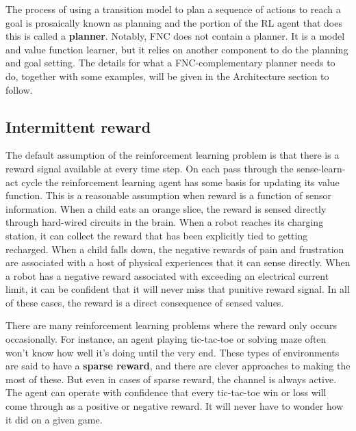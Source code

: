 The process of using a transition model to plan a sequence of actions
to reach a goal is prosaically known as planning and the portion of
the RL agent that does this is called a \textbf{planner}.
Notably, FNC does not contain a planner. It is a model
and value function learner, but it relies on another component to do
the planning and goal setting. The details for what a FNC-complementary
planner needs to do, together with some examples, will be given in
the Architecture section to follow. 

\subsection{Intermittent reward}
\label{subsec:introintermittent}

The default assumption of the reinforcement learning problem is that there is
a reward signal available at every time step. On each pass through the sense-learn-act
cycle the reinforcement learning agent has some basis for updating its
value function. This is a reasonable assumption when reward is a function of
sensor information. When a child eats an orange slice, the reward is sensed directly
through hard-wired circuits in the brain.
When a robot reaches its charging station, it can collect the reward that has
been explicitly tied to getting recharged. When a child falls down, the negative
rewards of pain and frustration are associated with a host of physical experiences
that it can sense directly. When a robot has a negative reward associated with
exceeding an electrical current limit, it can be confident that it will never
miss that punitive reward signal. In all of these cases, the reward
is a direct consequence of sensed values.

There are many reinforcement learning problems where the reward only occurs
occasionally. For instance, an agent playing tic-tac-toe or solving maze often
won’t know how well it’s doing until the very end. These types of environments are
said to have a \textbf{sparse reward}, and there are clever approaches to making the
most of these. But even in cases of sparse reward, the channel is always active.
The agent can operate with confidence that every tic-tac-toe win or loss will
come through as a positive or negative reward.  It will never have to wonder how it
did on a given game.

